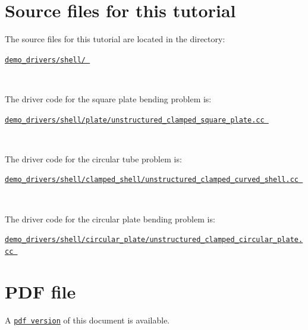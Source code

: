  

\hypertarget{index_sources}{}\section{Source files for this tutorial}\label{index_sources}

\begin{DoxyItemize}
\item The source files for this tutorial are located in the directory\+:~\newline
~\newline
\begin{center} \href{../../../../demo_drivers/shell/}{\tt demo\+\_\+drivers/shell/ } \end{center} ~\newline

\item The driver code for the square plate bending problem is\+: ~\newline
~\newline
\begin{center} \href{
../../../../
demo_drivers/shell/plate/unstructured_clamped_square_plate.cc
}{\tt demo\+\_\+drivers/shell/plate/unstructured\+\_\+clamped\+\_\+square\+\_\+plate.\+cc } \end{center} ~\newline

\item The driver code for the circular tube problem is\+: ~\newline
~\newline
\begin{center} \href{
../../../../
demo_drivers/shell/clamped_shell/unstructured_clamped_curved_shell.cc
}{\tt demo\+\_\+drivers/shell/clamped\+\_\+shell/unstructured\+\_\+clamped\+\_\+curved\+\_\+shell.\+cc } \end{center} ~\newline

\item The driver code for the circular plate bending problem is\+: ~\newline
~\newline
\begin{center} \href{
../../../../
demo_drivers/shell/circular_plate/unstructured_clamped_circular_plate.cc
}{\tt demo\+\_\+drivers/shell/circular\+\_\+plate/unstructured\+\_\+clamped\+\_\+circular\+\_\+plate.\+cc } \end{center} 
\end{DoxyItemize}

 

 \hypertarget{index_pdf}{}\section{P\+D\+F file}\label{index_pdf}
A \href{../latex/refman.pdf}{\tt pdf version} of this document is available. 
